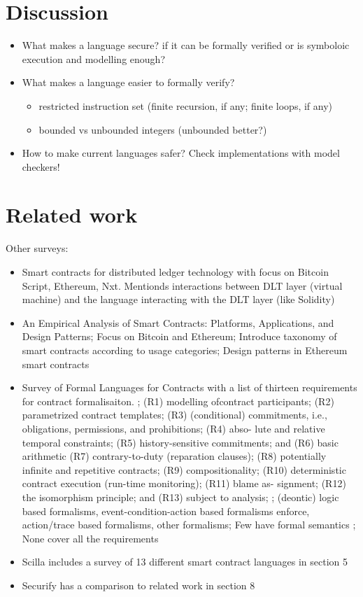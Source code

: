 \documentclass{llncs}
\begin{document}
\section{Discussion}
\label{discuss}
\begin{itemize}
\item What makes a language secure? if it can be formally verified or is symboloic execution and modelling enough?
\item What makes a language easier to formally verify?
\begin{itemize}
\item restricted instruction set (finite recursion, if any; finite loops, if any)
\item bounded vs unbounded integers (unbounded better?)
\end{itemize}
\item How to make current languages safer? Check implementations with model checkers!
\end{itemize}

\section{Related work}
\label{related}
Other surveys:
\begin{itemize}
\item Smart contracts for distributed ledger technology with focus on Bitcoin Script, Ethereum, Nxt. Mentionds interactions between DLT layer (virtual machine) and the language interacting with the DLT layer (like Solidity) \cite{Seijas2017}
\item An Empirical Analysis of Smart Contracts: Platforms, Applications, and Design Patterns; Focus on Bitcoin and Ethereum; Introduce taxonomy of smart contracts according to usage categories; Design patterns in Ethereum smart contracts \cite{Bartoletti2017}
\item Survey of Formal Languages for Contracts with a list of thirteen requirements for contract formalisaiton. ; (R1) modelling ofcontract participants; (R2) parametrized contract templates; (R3) (conditional) commitments, i.e., obligations, permissions, and prohibitions; (R4) abso- lute and relative temporal constraints; (R5) history-sensitive commitments; and (R6) basic arithmetic
(R7) contrary-to-duty (reparation clauses); (R8) potentially infinite and repetitive contracts; (R9) compositionality; (R10) deterministic contract execution (run-time monitoring); (R11) blame as- signment; (R12) the isomorphism principle; and (R13) subject to analysis;  \cite{Hvitved2010}; (deontic) logic based formalisms, event-condition-action based formalisms enforce, action/trace based formalisms, other formalisms; Few have formal semantics \cite{Andersen2006} \cite{Kyas2008} \cite{Xu2004}; None cover all the requirements
\item Scilla includes a survey of 13 different smart contract languages in section 5 \cite{Sergey2018}
\item Securify has a comparison to related work in section 8 \cite{Tsankov2017}
\end{itemize}
\end{document}

